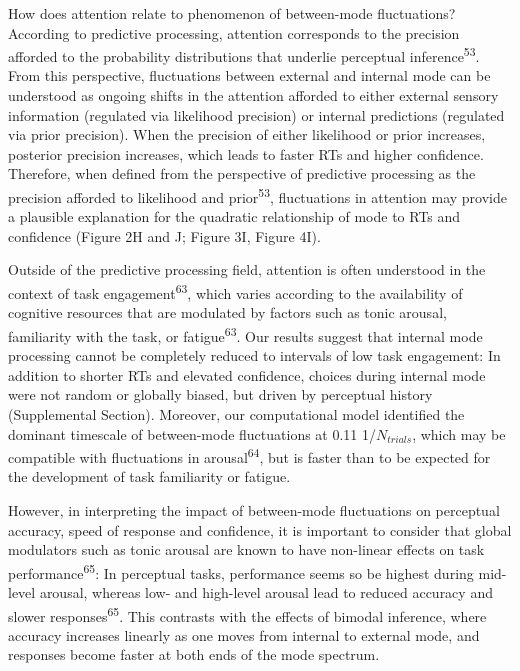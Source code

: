\documentclass[
]{article}
\begin{document}
How does attention relate to phenomenon of between-mode fluctuations?
According to predictive processing, attention corresponds to the
precision afforded to the probability distributions that underlie
perceptual inference\textsuperscript{53}. From this perspective,
fluctuations between external and internal mode can be understood as
ongoing shifts in the attention afforded to either external sensory
information (regulated via likelihood precision) or internal predictions
(regulated via prior precision). When the precision of either likelihood
or prior increases, posterior precision increases, which leads to faster
RTs and higher confidence. Therefore, when defined from the perspective
of predictive processing as the precision afforded to likelihood and
prior\textsuperscript{53}, fluctuations in attention may provide a
plausible explanation for the quadratic relationship of mode to RTs and
confidence (Figure 2H and J; Figure 3I, Figure 4I).

Outside of the predictive processing field, attention is often
understood in the context of task engagement\textsuperscript{63}, which
varies according to the availability of cognitive resources that are
modulated by factors such as tonic arousal, familiarity with the task,
or fatigue\textsuperscript{63}. Our results suggest that internal mode
processing cannot be completely reduced to intervals of low task
engagement: In addition to shorter RTs and elevated confidence, choices
during internal mode were not random or globally biased, but driven by
perceptual history (Supplemental Section). Moreover, our computational
model identified the dominant timescale of between-mode fluctuations at
0.11 1/\(N_{trials}\), which may be compatible with fluctuations in
arousal\textsuperscript{64}, but is faster than to be expected for the
development of task familiarity or fatigue.

However, in interpreting the impact of between-mode fluctuations on
perceptual accuracy, speed of response and confidence, it is important
to consider that global modulators such as tonic arousal are known to
have non-linear effects on task performance\textsuperscript{65}: In
perceptual tasks, performance seems so be highest during mid-level
arousal, whereas low- and high-level arousal lead to reduced accuracy
and slower responses\textsuperscript{65}. This contrasts with the
effects of bimodal inference, where accuracy increases linearly as one
moves from internal to external mode, and responses become faster at
both ends of the mode spectrum.
\end{document}
